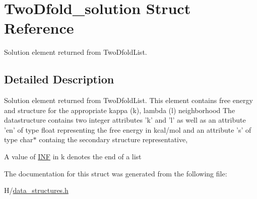 \hypertarget{structTwoDfold__solution}{
\section{TwoDfold\_\-solution Struct Reference}
\label{structTwoDfold__solution}
}


Solution element returned from TwoDfoldList.  




\subsection{Detailed Description}
Solution element returned from TwoDfoldList. This element contains free energy and structure for the appropriate kappa (k), lambda (l) neighborhood The datastructure contains two integer attributes 'k' and 'l' as well as an attribute 'en' of type float representing the free energy in kcal/mol and an attribute 's' of type char$\ast$ containg the secondary structure representative,

A value of \hyperlink{energy__const_8h_a12c2040f25d8e3a7b9e1c2024c618cb6}{INF} in k denotes the end of a list 

The documentation for this struct was generated from the following file:\begin{DoxyCompactItemize}
\item 
H/\hyperlink{data__structures_8h}{data\_\-structures.h}\end{DoxyCompactItemize}
